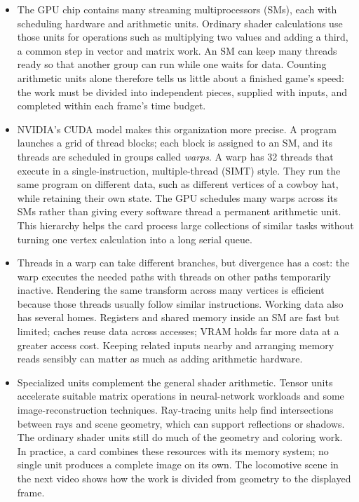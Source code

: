 \documentclass[10pt]{article}
\begin{document}
\begin{itemize}[leftmargin=1.25em, itemsep=0.3em, parsep=0pt, topsep=0pt]
    \item The GPU chip contains many streaming multiprocessors (SMs), each with scheduling hardware and arithmetic units. Ordinary shader calculations use those units for operations such as multiplying two values and adding a third, a common step in vector and matrix work. An SM can keep many threads ready so that another group can run while one waits for data. Counting arithmetic units alone therefore tells us little about a finished game's speed: the work must be divided into independent pieces, supplied with inputs, and completed within each frame's time budget.

    \item NVIDIA's CUDA model makes this organization more precise. A program launches a grid of thread blocks; each block is assigned to an SM, and its threads are scheduled in groups called \textit{warps}. A warp has 32 threads that execute in a single-instruction, multiple-thread (SIMT) style. They run the same program on different data, such as different vertices of a cowboy hat, while retaining their own state. The GPU schedules many warps across its SMs rather than giving every software thread a permanent arithmetic unit. This hierarchy helps the card process large collections of similar tasks without turning one vertex calculation into a long serial queue.

    \item Threads in a warp can take different branches, but divergence has a cost: the warp executes the needed paths with threads on other paths temporarily inactive. Rendering the same transform across many vertices is efficient because those threads usually follow similar instructions. Working data also has several homes. Registers and shared memory inside an SM are fast but limited; caches reuse data across accesses; VRAM holds far more data at a greater access cost. Keeping related inputs nearby and arranging memory reads sensibly can matter as much as adding arithmetic hardware.

    \item Specialized units complement the general shader arithmetic. Tensor units accelerate suitable matrix operations in neural-network workloads and some image-reconstruction techniques. Ray-tracing units help find intersections between rays and scene geometry, which can support reflections or shadows. The ordinary shader units still do much of the geometry and coloring work. In practice, a card combines these resources with its memory system; no single unit produces a complete image on its own. The locomotive scene in the next video shows how the work is divided from geometry to the displayed frame.
\end{itemize}
\end{document}
